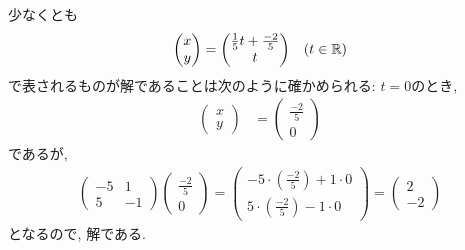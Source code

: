 \begin{checkanswer}%
  少なくとも
  \begin{align*}
      \begin{pmatrix}x\\y\end{pmatrix}
        &=\begin{pmatrix}\frac{1}{5}t+\frac{-2}{5}\\t\end{pmatrix}
        &(t\in \mathbb{R})
  \end{align*}
  で表されるものが解であることは次のように確かめられる:
  $t=0$のとき,
  \begin{align*}
      \begin{pmatrix}x\\y\end{pmatrix}
        &=\begin{pmatrix}\frac{-2}{5}\\0\end{pmatrix}
  \end{align*}
  であるが,
  \begin{align*}
    \begin{pmatrix}-5&1\\5&-1\end{pmatrix}
      \begin{pmatrix}\frac{-2}{5}\\0\end{pmatrix}
        =
    \begin{pmatrix}-5\cdot(\frac{-2}{5})+1\cdot 0 \\5\cdot(\frac{-2}{5})-1\cdot 0\end{pmatrix}
        =
    \begin{pmatrix}2 \\-2\end{pmatrix}
  \end{align*}
  となるので, 解である.
  

\end{checkanswer}
